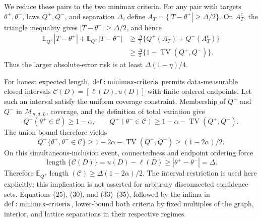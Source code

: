 We reduce these pairs to the two minimax criteria.  For any pair with targets \(\theta^+,\theta^-\), laws \(Q^+,Q^-\), and separation \(\Delta\), define \(A_T=\{|T-\theta^+|\geq\Delta/2\}\).  On \(A_T^c\), the triangle inequality gives \(|T-\theta^-|\geq\Delta/2\), and hence
\[
\begin{aligned}
 \mathbb E_{Q^+}|T-\theta^+|+\mathbb E_{Q^-}|T-\theta^-|
 &\geq\frac\Delta2\{Q^+(A_T)+Q^-(A_T^c)\}\\
 &\geq\frac\Delta2\{1-\operatorname{TV}(Q^+,Q^-)\}.
\end{aligned}
\tag{34}
\]
Thus the larger absolute-error risk is at least \(\Delta(1-\eta)/4\).

For honest expected length, \({\rm def:minimax\text{-}criteria}\) permits data-measurable closed intervals \(\mathcal C(D)=[\ell(D),u(D)]\) with finite ordered endpoints.  Let such an interval satisfy the uniform coverage constraint.  Membership of \(Q^+\) and \(Q^-\) in \(\mathcal M_{n,d,L}\), coverage, and the definition of total variation give
\[
 Q^+(\theta^+\in\mathcal C)\geq1-\alpha,
 \qquad
 Q^+(\theta^-\in\mathcal C)
 \geq1-\alpha-\operatorname{TV}(Q^+,Q^-).
\]
The union bound therefore yields
\[
 Q^+\{\theta^+,\theta^-\in\mathcal C\}
 \geq1-2\alpha-\operatorname{TV}(Q^+,Q^-)
 \geq(1-2\alpha)/2.
\tag{35}
\]
On this simultaneous-inclusion event, connectedness and endpoint ordering force
\[
 \operatorname{length}\{\mathcal C(D)\}=u(D)-\ell(D)
 \geq|\theta^+-\theta^-|=\Delta.
\]
Therefore \(\mathbb E_{Q^+}\operatorname{length}(\mathcal C)\geq\Delta(1-2\alpha)/2\).  The interval restriction is used here explicitly; this implication is not asserted for arbitrary disconnected confidence sets.  Equations (25), (30), and (33)--(35), followed by the infima in \({\rm def:minimax\text{-}criteria}\), lower-bound both criteria by fixed multiples of the graph, interior, and lattice separations in their respective regimes.

